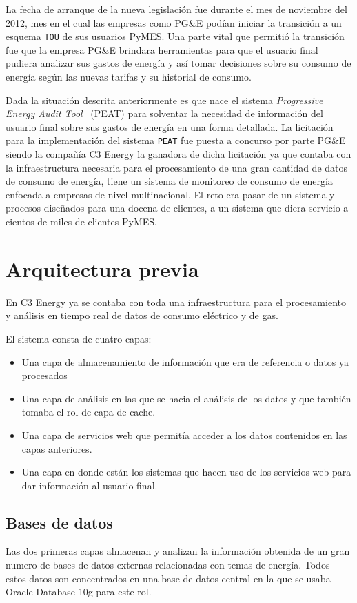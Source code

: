 La fecha de arranque de la nueva legislación fue durante el mes de noviembre
del 2012, mes en el cual las empresas como PG\&E podían iniciar la transición
a un esquema \texttt{TOU} de sus usuarios PyMES.
Una parte vital que permitió la transición fue que la empresa PG\&E brindara
herramientas para que el usuario final pudiera analizar sus gastos de energía
y así tomar decisiones sobre su consumo de energía según las nuevas tarifas
y su historial de consumo.

Dada la situación descrita anteriormente es que nace el sistema
\textit{Progressive Energy Audit Tool} \ (PEAT) para solventar la necesidad
de información del usuario final sobre sus gastos de energía en una forma detallada.
La licitación para la implementación del sistema \texttt{PEAT} fue puesta
a concurso por parte PG\&E siendo la compañía C3 Energy la ganadora de dicha
licitación  ya que contaba con la infraestructura necesaria para el
procesamiento de una gran cantidad de datos de consumo de energía,
tiene un sistema de monitoreo de consumo de energía enfocada a empresas de nivel
multinacional. El reto era pasar de un sistema y procesos diseñados
para una docena de clientes, a un sistema que diera servicio a
cientos de miles de clientes PyMES.

\section{Arquitectura previa}
En C3 Energy ya se contaba con toda una infraestructura para el
procesamiento y análisis en tiempo real de datos de consumo eléctrico
y de gas.

El sistema consta de cuatro capas:

\begin{itemize}
\item Una capa de almacenamiento de información que era de referencia
  o datos ya procesados
\item Una capa de análisis en las que se hacia el análisis de los datos
  y que también tomaba el rol de capa de cache.
\item Una capa de servicios web que permitía acceder a los datos contenidos
  en las capas anteriores.
\item Una capa en donde están los sistemas que hacen uso de los
  servicios web para dar información al usuario final.
\end{itemize}

\subsection{Bases de datos}
Las dos primeras capas almacenan y analizan la información obtenida
de un gran numero de bases de datos externas relacionadas con temas
de energía. Todos estos datos son concentrados en una base de datos
central en la que se usaba Oracle Database 10g para este rol.

